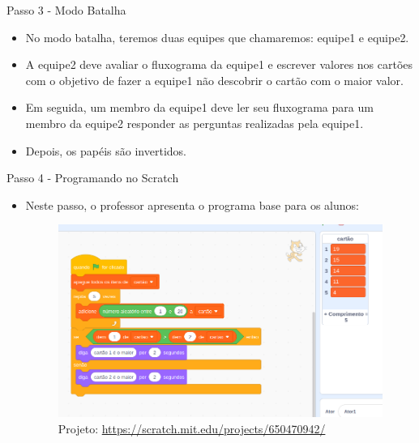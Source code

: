 \documentclass{beamer}
\begin{document}
\begin{frame}{Passo 3 - Modo Batalha}

\begin{itemize}

\item <1-> No modo batalha, teremos duas equipes que chamaremos: equipe1 e equipe2.

\item <2-> A equipe2 deve avaliar o fluxograma da equipe1 e escrever valores nos cartões com o objetivo de fazer a equipe1 não descobrir o cartão com o maior valor.

\item <3-> Em seguida, um membro da equipe1 deve ler seu fluxograma para um membro da equipe2 responder as perguntas realizadas pela equipe1.


\item <4-> Depois, os papéis são invertidos.

\end{itemize}


\end{frame}


\begin{frame}{Passo 4 - Programando no Scratch}

\begin{itemize}

\item Neste passo, o professor apresenta o programa base para os alunos:


\begin{figure}
\begin{center}
	\includegraphics[scale=0.25]{images/condicional.png} 
\end{center}
\caption{Projeto: \url{https://scratch.mit.edu/projects/650470942/}}
\end{figure}




\end{itemize}


\end{frame}
\end{document}
